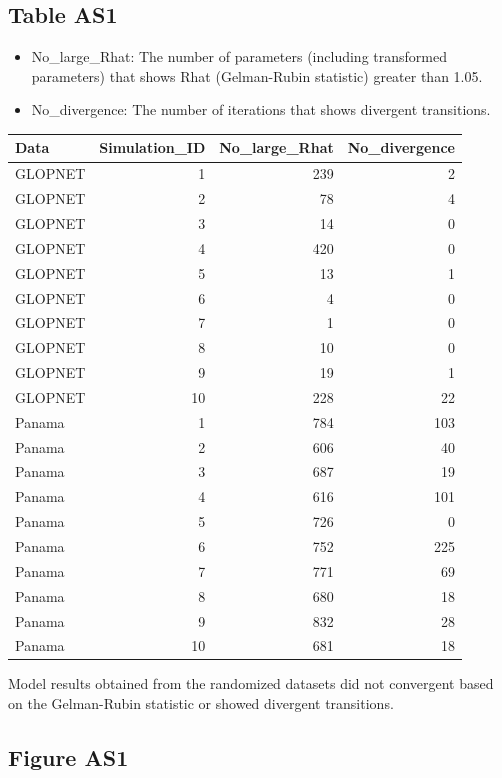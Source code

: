 \documentclass[
  12pt,
  letterpaper,
  DIV=11,
  numbers=noendperiod]{scrartcl}
\providecommand{\tightlist}{%
  \setlength{\itemsep}{0pt}\setlength{\parskip}{0pt}}\usepackage{longtable,booktabs,array}
\begin{document}
\hypertarget{table-as1}{%
\subsection{Table AS1}\label{table-as1}}

\begin{itemize}
\tightlist
\item
  No\_large\_Rhat: The number of parameters (including transformed
  parameters) that shows Rhat (Gelman-Rubin statistic) greater than
  1.05.
\item
  No\_divergence: The number of iterations that shows divergent
  transitions.
\end{itemize}

\begin{longtable}[]{@{}lrrr@{}}
\toprule()
Data & Simulation\_ID & No\_large\_Rhat & No\_divergence \\
\midrule()
\endhead
GLOPNET & 1 & 239 & 2 \\
GLOPNET & 2 & 78 & 4 \\
GLOPNET & 3 & 14 & 0 \\
GLOPNET & 4 & 420 & 0 \\
GLOPNET & 5 & 13 & 1 \\
GLOPNET & 6 & 4 & 0 \\
GLOPNET & 7 & 1 & 0 \\
GLOPNET & 8 & 10 & 0 \\
GLOPNET & 9 & 19 & 1 \\
GLOPNET & 10 & 228 & 22 \\
Panama & 1 & 784 & 103 \\
Panama & 2 & 606 & 40 \\
Panama & 3 & 687 & 19 \\
Panama & 4 & 616 & 101 \\
Panama & 5 & 726 & 0 \\
Panama & 6 & 752 & 225 \\
Panama & 7 & 771 & 69 \\
Panama & 8 & 680 & 18 \\
Panama & 9 & 832 & 28 \\
Panama & 10 & 681 & 18 \\
\bottomrule()
\end{longtable}

Model results obtained from the randomized datasets did not convergent
based on the Gelman-Rubin statistic or showed divergent transitions.

\newpage

\hypertarget{figure-as1}{%
\subsection{Figure AS1}\label{figure-as1}}
\end{document}
